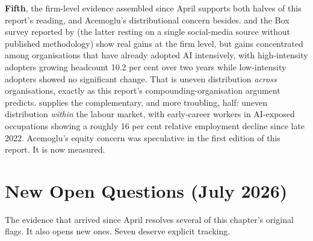 \textbf{Fifth}, the firm-level evidence assembled since April supports both halves of this report's reading, and Acemoglu's distributional concern besides. \textcite{RampRevelio2026} and the Box survey reported by \textcite{Levie2026} (the latter resting on a single social-media source without published methodology) show real gains at the firm level, but gains concentrated among organisations that have already adopted AI intensively, with high-intensity adopters growing headcount 10.2 per cent over two years while low-intensity adopters showed no significant change. That is uneven distribution \emph{across} organisations, exactly as this report's compounding-organisation argument predicts. \parencite{Brynjolfsson2025Canaries} supplies the complementary, and more troubling, half: uneven distribution \emph{within} the labour market, with early-career workers in AI-exposed occupations showing a roughly 16 per cent relative employment decline since late 2022. Acemoglu's equity concern was speculative in the first edition of this report. It is now measured.

\section{New Open Questions (July 2026)}

The evidence that arrived since April resolves several of this chapter's original flags. It also opens new ones. Seven deserve explicit tracking.

